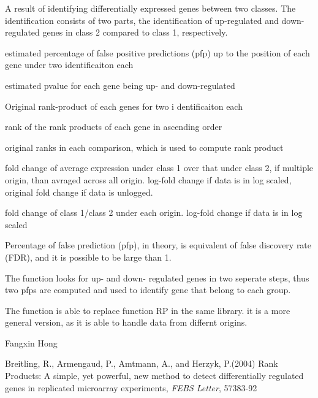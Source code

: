 \begin{Value}
A result of identifying differentially expressed 
genes between two classes. The identification consists of two parts,
the identification of  up-regulated  and down-regulated genes in class 2
compared to class 1, respectively. 

\begin{ldescription}
\item[\code{pfp}] estimated percentage of false positive predictions
(pfp) up to  the position of each gene under two 
identificaiton each
\item[\code{pval}] estimated pvalue for each gene being up- and down-regulated
\item[\code{RPs}] Original rank-product of each genes for two i
dentificaiton each 
\item[\code{RPrank}] rank of the rank products of each gene in 
ascending order
\item[\code{Orirank}] original ranks in each comparison, which 
is used to compute rank product
\item[\code{AveFC}] fold change of average expression under class 1 over 
that under class 2, if multiple origin, than avraged 
across all origin. log-fold change if data is in log scaled, 
original fold change if data is unlogged. 
\item[\code{all.FC}] fold change of class 1/class 2 under each origin.
log-fold change if data is in log scaled
\end{ldescription}
\end{Value}
\begin{Note}\relax
Percentage of false prediction (pfp), in theory, is 
equivalent of false discovery rate (FDR), and it is 
possible to be large than 1.

The function looks for up- and down- regulated genes in two
seperate steps, thus two pfps are computed and used to identify 
gene that belong to each group.   

The function is able to replace function RP in the 
same library. it is a more  general version, as it is
able to handle data from differnt origins.
\end{Note}
\begin{Author}\relax
Fangxin Hong 
\end{Author}
\begin{References}\relax
Breitling, R., Armengaud, P., Amtmann, A., and Herzyk, 
P.(2004) Rank Products: A simple, yet powerful, new method 
to detect differentially regulated genes in
replicated microarray experiments, \emph{FEBS Letter}, 57383-92
\end{References}
